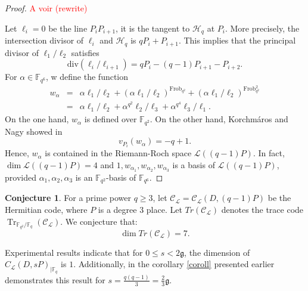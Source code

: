 \documentclass[a4paper]{amsart}
\theoremstyle{plain}
\theoremstyle{definition}
\newtheorem{conjecture}{Conjecture}[section]
\theoremstyle{remark}
\newcommand{\g}{\mathfrak{g}}
\DeclareMathOperator{\trace}{Tr}
\newcommand{\calC}{\mathcal{C}}
\begin{document}
\begin{proof}
	\textcolor{red}{A voir (rewrite)}
	
	Let $\ell_i=0$ be the line $P_iP_{i+1}$, it is the tangent to $\mathscr{H}_q$ at $P_i$. More precisely, the intersection divisor of $\ell_i$ and $\mathscr{H}_q$ is $qP_i+P_{i+1}$. This implies that the principal divisor of $\ell_1/\ell_2$ satisfies
	\[\mathrm{div}(\ell_i/\ell_{i+1})=qP_i-(q-1)P_{i+1}-P_{i+2}.\]
	For $\alpha \in \mathbb{F}_{q^6}$, w define the function
	\begin{eqnarray*}
		w_\alpha&=&\alpha\ell_1/\ell_2+(\alpha\ell_1/\ell_2)^{\mathrm{Frob}_{q^2}}+(\alpha\ell_1/\ell_2)^{\mathrm{Frob}_{q^2}^2}\\
		&=&\alpha\ell_1/\ell_2+\alpha^{q^2}\ell_2/\ell_3+\alpha^{q^4}\ell_3/\ell_1.
	\end{eqnarray*}
	On the one hand, $w_\alpha$ is defined over $\mathbb{F}_{q^2}$. On the other hand, Korchm\'aros and Nagy showed in \cite[Theorem ~3.1]{korchmaros2013hermitian}
	\[v_{P_i}(w_\alpha)=-q+1.\]
	Hence, $w_\alpha$ is contained in the Riemann-Roch space $\mathcal{L}((q-1)P)$. In fact, $\dim\mathcal{L}((q-1)P)=4$ and $1,w_{\alpha_1}, w_{\alpha_2}, w_{\alpha_3}$ is a basis of $\mathcal{L}((q-1)P)$, provided $\alpha_1,\alpha_2,\alpha_3$ is an $\mathbb{F}_{q^2}$-basis of $\mathbb{F}_{q^6}$. 
\end{proof}







\begin{conjecture} 
	For a prime power $q \geq 3$, let  $\calC_{\mathcal{L}}=\calC_{\mathcal{L}}( D, (q-1)P)$ be the Hermitian code, where $P$ is a degree 3 place. Let $Tr(\calC_{\mathcal{L}})$ denotes the trace code $\trace_{\mathbb{F}_{q^2} / \mathbb{F}_q}(\calC_{\mathcal{L}})$. We conjecture that:
	\[\dim Tr(\calC_{\mathcal{L}}) = 7 .\]
\end{conjecture}


Experimental results indicate that for $0 \leq s < 2\mathfrak{g}$, the dimension of $C_{\mathcal{L}}(D,sP)_{\mid \mathbb{F}_q}$ is $1$. Additionally, in the corollary \ref{coroll} presented earlier demonstrates this result for $ s =\frac{q(q-1)}{3}=\frac{2}{3} \g$.
\end{document}
